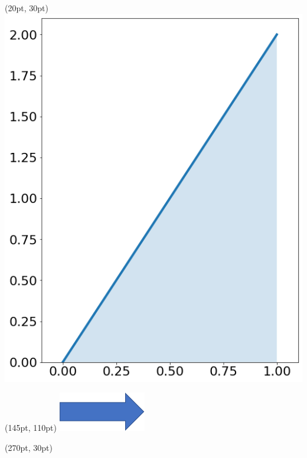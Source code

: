 \documentclass[aspectratio=169,unicode,dvipdfmx,14pt]{beamer}
\begin{document}
\begin{frame}
\begin{textblock*}{0.4\linewidth}(20pt, 30pt)
    \centering
    \includegraphics[width=\linewidth]{beta_2_1.png}
\end{textblock*}
\begin{textblock*}{0.4\linewidth}(145pt, 110pt)
    \centering
    \includegraphics[width=0.3\linewidth]{blue_arrow.png}
\end{textblock*}
\begin{textblock*}{0.4\linewidth}(270pt, 30pt)
    \centering

\end{textblock*}
\end{frame}
\end{document}
